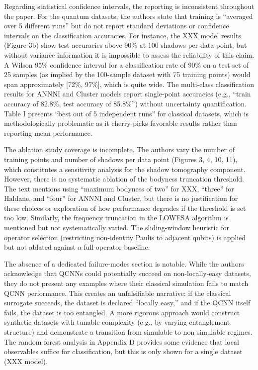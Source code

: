 \documentclass[10pt,letterpaper]{article}
\begin{document}
Regarding statistical confidence intervals, the reporting is inconsistent throughout the paper. For the quantum datasets, the authors state that training is ``averaged over 5 different runs'' but do not report standard deviations or confidence intervals on the classification accuracies. For instance, the XXX model results (Figure 3b) show test accuracies above 90\% at 100 shadows per data point, but without variance information it is impossible to assess the reliability of this claim. A Wilson 95\% confidence interval for a classification rate of 90\% on a test set of 25 samples (as implied by the 100-sample dataset with 75 training points) would span approximately {[}72\%, 97\%{]}, which is quite wide. The multi-class classification results for ANNNI and Cluster models report single-point accuracies (e.g., ``train accuracy of 82.8\%, test accuracy of 85.8\%'') without uncertainty quantification. Table I presents ``best out of 5 independent runs'' for classical datasets, which is methodologically problematic as it cherry-picks favorable results rather than reporting mean performance.

The ablation study coverage is incomplete. The authors vary the number of training points and number of shadows per data point (Figures 3, 4, 10, 11), which constitutes a sensitivity analysis for the shadow tomography component. However, there is no systematic ablation of the bodyness truncation threshold. The text mentions using ``maximum bodyness of two'' for XXX, ``three'' for Haldane, and ``four'' for ANNNI and Cluster, but there is no justification for these choices or exploration of how performance degrades if the threshold is set too low. Similarly, the frequency truncation in the LOWESA algorithm is mentioned but not systematically varied. The sliding-window heuristic for operator selection (restricting non-identity Paulis to adjacent qubits) is applied but not ablated against a full-operator baseline.

The absence of a dedicated failure-modes section is notable. While the authors acknowledge that QCNNs could potentially succeed on non-locally-easy datasets, they do not present any examples where their classical simulation fails to match QCNN performance. This creates an unfalsifiable narrative: if the classical surrogate succeeds, the dataset is declared ``locally easy,'' and if the QCNN itself fails, the dataset is too entangled. A more rigorous approach would construct synthetic datasets with tunable complexity (e.g., by varying entanglement structure) and demonstrate a transition from simulable to non-simulable regimes. The random forest analysis in Appendix D provides some evidence that local observables suffice for classification, but this is only shown for a single dataset (XXX model).
\end{document}
